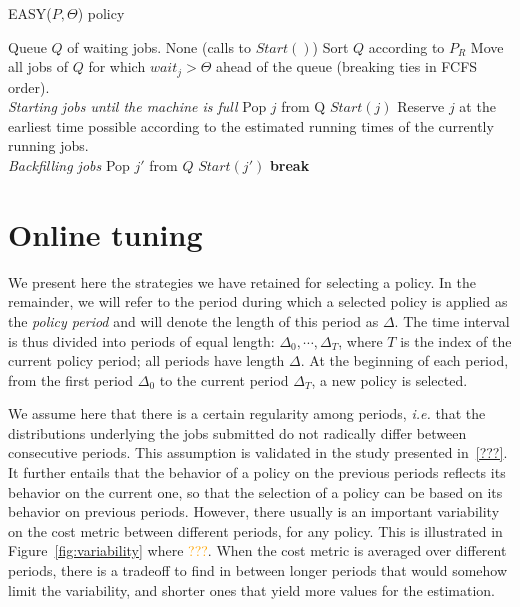 \documentclass[sigconf]{acmart}
\begin{document}
\begin{algorithm}[h]
  \caption{EASY($P,\Theta$) policy}
  \begin{algorithmic}[1]
    \renewcommand{\algorithmicrequire}{\textbf{Input:}}
    \renewcommand{\algorithmicensure}{\textbf{Output:}}
    \REQUIRE Queue $Q$ of waiting jobs.
    \ENSURE None (calls to $Start()$)
    \STATE Sort $Q$ according to $P_R$
    \STATE Move all jobs of $Q$ for which $wait_j > \Theta$ ahead
    of the queue (breaking ties in FCFS order).
    \\ \textit{Starting jobs until the machine is full}
    \STATE Pop $j$ from Q
    \STATE $Start(j)$
    \ELSE
    \STATE Reserve $j$ at the earliest
    time possible according to the estimated running times
    of the currently running jobs.
    \\ \textit{Backfilling jobs}
    \STATE Pop $j'$ from $Q$
    \STATE $Start(j')$
    \ENDIF
    \ENDFOR
    \STATE \textbf{break}
    \ENDIF
    \ENDFOR
  \end{algorithmic}
  \label{alg:EASY}
\end{algorithm}

\section{Online tuning}
\label{sec:online}

We present here the strategies we have retained for selecting a policy. In the remainder, we will refer to the period during which a selected policy is applied as the \textit{policy period} and will denote the length of this period as $\Delta$. The time interval is thus divided into periods of equal length: $\Delta_0, \cdots, \Delta_T$, where $T$ is the index of the current policy period; all periods have length $\Delta$. At the beginning of each period, from the first period $\Delta_0$ to the current period $\Delta_T$, a new policy is selected.

We assume here that there is a certain regularity among periods, \textit{i.e.} that the distributions underlying the jobs submitted do not radically differ between consecutive periods. This assumption is validated in the study presented in~\ref{???}. It further entails that the behavior of a policy on the previous periods reflects its behavior on the current one, so that the selection of a policy can be based on its behavior on previous periods. However, there usually is an important variability on the cost metric between different periods, for any policy. This is illustrated in Figure~\ref{fig:variability} where \textcolor{orange}{???}. When the cost metric is averaged over different periods, there is a tradeoff to find in between longer periods that would somehow limit the variability, and shorter ones that yield more values for the estimation.
\end{document}
